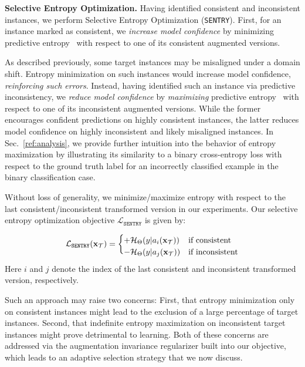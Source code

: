 \documentclass[10pt,twocolumn,letterpaper]{article}
\newcommand{\method}{\texttt{SENTRY}\xspace}
\begin{document}
 
\noindent \textbf{Selective Entropy Optimization.} Having identified consistent and inconsistent instances, we perform Selective Entropy Optimization (\method). 
First, for an instance marked as consistent, we \emph{increase model confidence} by minimizing predictive entropy~\cite{grandvalet2005semi} with respect to one of its consistent augmented versions.

As described previously, some target instances may be misaligned under a domain shift. Entropy minimization on such instances would increase model confidence, \emph{reinforcing such errors}. Instead, having identified such an instance via predictive inconsistency, we \emph{reduce model confidence} by \emph{maximizing} predictive entropy~\cite{pereyra2017regularizing} with respect to one of its inconsistent augmented versions.
While the former encourages confident predictions on highly consistent instances, the latter reduces model confidence on highly inconsistent and likely misaligned instances. In Sec.~\ref{ref:analysis}, we provide further intuition into the behavior of entropy maximization by illustrating its similarity to a binary cross-entropy loss with respect to the ground truth label for an incorrectly classified example in the binary classification case.

Without loss of generality, we minimize/maximize entropy with respect to the last consistent/inconsistent transformed version in our experiments. Our selective entropy optimization objective $\mathcal{L}_{\method}$ is given by:

\vspace{-15pt}
\begin{equation}
\mathcal{L}_{\method}(\mathbf{x}_\target)= 
\begin{cases}
  + \mathcal{H}_{\modelparams}(y|a_i(\mathbf{x}_\target))  & \text{if consistent} \\
  - \mathcal{H}_{\modelparams}(y|a_j(\mathbf{x}_\target))  & \text{if inconsistent}
\vspace{-5pt}
\end{cases}
\end{equation}

\noindent Here $i$ and $j$ denote the index of the last consistent and inconsistent transformed version, respectively.

Such an approach may raise two concerns: First, that entropy minimization only on consistent instances might lead to the exclusion of a large percentage of target instances. Second, that indefinite entropy maximization on inconsistent target instances might prove detrimental to learning. Both of these concerns are addressed via the augmentation invariance regularizer built into our objective, which leads to an adaptive selection strategy that we now discuss.
\end{document}
